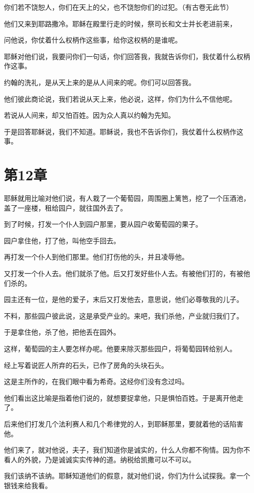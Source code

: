 \documentclass[12pt,oneside]{book}
\begin{document}
你们若不饶恕人，你们在天上的父，也不饶恕你们的过犯。（有古卷无此节）

他们又来到耶路撒冷。耶稣在殿里行走的时候，祭司长和文士并长老进前来，

问他说，你仗着什么权柄作这些事，给你这权柄的是谁呢。

耶稣对他们说，我要问你们一句话，你们回答我，我就告诉你们，我仗着什么权柄作这事。

约翰的洗礼，是从天上来的是从人间来的呢。你们可以回答我。

他们彼此商论说，我们若说从天上来，他必说，这样，你们为什么不信他呢。

若说从人间来，却又怕百姓。因为众人真以约翰为先知。

于是回答耶稣说，我们不知道。耶稣说，我也不告诉你们，我仗着什么权柄作这事。

\chapter{第12章}
耶稣就用比喻对他们说，有人栽了一个葡萄园，周围圈上篱笆，挖了一个压酒池，盖了一座楼，租给园户，就往国外去了。

到了时候，打发一个仆人到园户那里，要从园户收葡萄园的果子。

园户拿住他，打了他，叫他空手回去。

再打发一个仆人到他们那里。他们打伤他的头，并且凌辱他。

又打发一个仆人去。他们就杀了他。后又打发好些仆人去。有被他们打的，有被他们杀的。

园主还有一位，是他的爱子，末后又打发他去，意思说，他们必尊敬我的儿子。

不料，那些园户彼此说，这是承受产业的。来吧，我们杀他，产业就归我们了。

于是拿住他，杀了他，把他丢在园外。

这样，葡萄园的主人要怎样办呢。他要来除灭那些园户，将葡萄园转给别人。

经上写着说匠人所弃的石头，已作了房角的头块石头。

这是主所作的，在我们眼中看为希奇。这经你们没有念过吗。

他们看出这比喻是指着他们说的，就想要捉拿他，只是惧怕百姓。于是离开他走了。

后来他们打发几个法利赛人和几个希律党的人，到耶稣那里，要就着他的话陷害他。

他们来了，就对他说，夫子，我们知道你是诚实的，什么人你都不徇情。因为你不看人的外貌，乃是诚诚实实传神的道。纳税给凯撒可以不可以。

我们该纳不该纳。耶稣知道他们的假意，就对他们说，你们为什么试探我。拿一个银钱来给我看。
\end{document}
